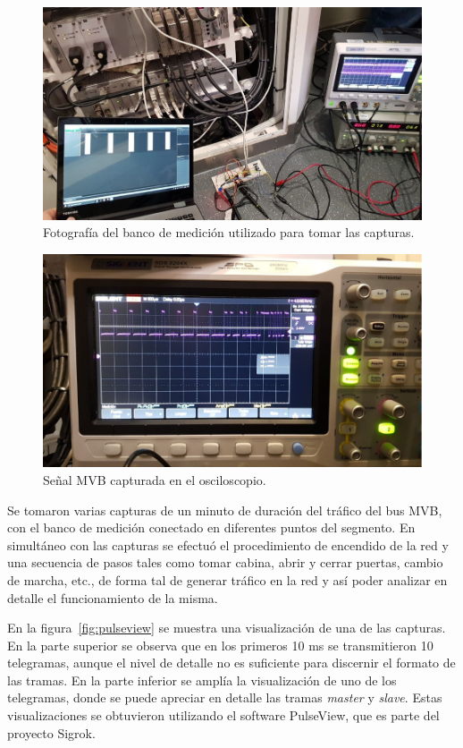 \begin{figure}[htbp]
	\centering
	\includegraphics[width=\textwidth]{./Figures/foto-capturas.jpg}
	\caption{Fotografía del banco de medición utilizado para tomar las capturas.}
    \label{fig:foto-banco-capturas}
\end{figure}

\begin{figure}[htbp]
	\centering
	\includegraphics[width=\textwidth]{./Figures/osciloscopio.jpg}
	\caption{Señal MVB capturada en el osciloscopio.}
    \label{fig:osciloscopio}
\end{figure}

Se tomaron varias capturas de un minuto de duración del tráfico del bus MVB, con el banco de medición conectado en diferentes puntos del segmento.
En simultáneo con las capturas se efectuó el procedimiento de encendido de la red y una secuencia de pasos tales como tomar cabina, abrir y cerrar puertas, cambio de marcha, etc., de forma tal de generar tráfico en la red y así poder analizar en detalle el funcionamiento de la misma.

En la figura~\ref{fig:pulseview} se muestra una visualización de una de las capturas.
En la parte superior se observa que en los primeros 10 ms se transmitieron 10 telegramas, aunque el nivel de detalle no es suficiente para discernir el formato de las tramas.
En la parte inferior se amplía la visualización de uno de los telegramas, donde se puede apreciar en detalle las tramas \textit{master} y \textit{slave}.
Estas visualizaciones se obtuvieron utilizando el software PulseView, que es parte del proyecto Sigrok.

